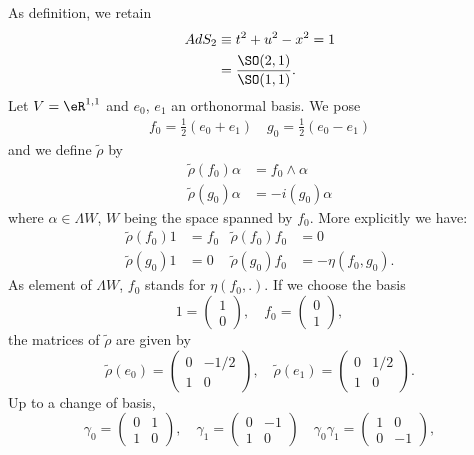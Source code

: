 As definition, we retain
\begin{equation}
	\begin{split}
		AdS_2&\equiv t^2+u^2-x^2=1\\
		&=\frac{ \SO(2,1) }{ \SO(1,1) }.
	\end{split}
\end{equation}
Let $V=\eR^{1,1}$ and $e_0$, $e_1$ an orthonormal basis. We pose
\begin{align*}
	f_0=\frac{ 1 }{2}(e_0+e_1)\quad g_0=\frac{ 1 }{2}(e_0-e_1)
\end{align*}
and we define $\tilde\rho$ by
\begin{subequations}
	\begin{align}
		\tilde\rho(f_0)\alpha & =f_0\wedge\alpha \\
		\tilde\rho(g_0)\alpha & =-i(g_0)\alpha
	\end{align}
\end{subequations}
where $\alpha\in\Lambda W$, $W$ being the space spanned by $f_0$. More explicitly we have:
\begin{subequations}
	\begin{align}
		\tilde\rho (f_0)1 & =f_0 & \tilde\rho (f_0)f_0 & =0               \\
		\tilde\rho (g_0)1 & =0   & \tilde\rho (g_0)f_0 & =-\eta(f_0,g_0).
	\end{align}
\end{subequations}
As element of $\Lambda W$, $f_0$ stands for $\eta(f_0,.)$. If we choose the basis
\[
	1=
	\begin{pmatrix}
		1 \\0
	\end{pmatrix},
	\quad
	f_0=
	\begin{pmatrix}
		0 \\1
	\end{pmatrix},
\]
the matrices of $\tilde\rho$ are given by
\[
	\tilde\rho(e_0)=
	\begin{pmatrix}
		0 & -1/2 \\
		1 & 0
	\end{pmatrix},
	\quad
	\tilde\rho(e_1)=
	\begin{pmatrix}
		0 & 1/2 \\
		1 & 0
	\end{pmatrix}.
\]
Up to a change of basis,
\[
	\gamma_0=
	\begin{pmatrix}
		0 & 1 \\1&0
	\end{pmatrix},
	\quad
	\gamma_1=
	\begin{pmatrix}
		0 & -1 \\1&0
	\end{pmatrix}
	\quad
	\gamma_0\gamma_1=
	\begin{pmatrix}
		1 & 0 \\0&-1
	\end{pmatrix},
\]
